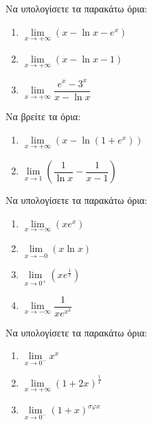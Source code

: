 \documentclass{presentation}
\begin{document}
\begin{askisi}
  Να υπολογίσετε τα παρακάτω όρια:
  \begin{enumerate}
    \item<1-> $\lim\limits_{x \to +\infty}{ (x-\ln x-e^x) }$
    \item<2-> $\lim\limits_{x \to +\infty}{ (x-\ln x-1) }$
    \item<3-> $\lim\limits_{x \to +\infty}{ \dfrac{e^x-3^x}{x-\ln x} }$
  \end{enumerate}

\end{askisi}

\begin{askisi}
  Να βρείτε τα όρια:
  \begin{enumerate}
    \item<1-> $\lim\limits_{x \to +\infty}{ (x-\ln (1+e^x)) }$
    \item<2-> $\lim\limits_{x \to 1}{ \left( \dfrac{1}{\ln x} - \dfrac{1}{x-1} \right)  }$
  \end{enumerate}

\end{askisi}

\begin{askisi}
  Να υπολογίσετε τα παρακάτω όρια:
  \begin{enumerate}
    \item<1-> $\lim\limits_{x \to -\infty}{ (xe^x) }$
    \item<2-> $\lim\limits_{x \to -0}{ (x\ln x) }$
    \item<3-> $\lim\limits_{x \to 0^+}{ \left( xe^{\frac{1}{x}} \right)  }$
    \item<4-> $\lim\limits_{x \to -\infty}{ \dfrac{1}{xe^{x^3}} }$
  \end{enumerate}

\end{askisi}

\begin{askisi}
  Να υπολογίσετε τα παρακάτω όρια:
  \begin{enumerate}[<+->]
    \item $\lim\limits_{x \to 0^-}{ x^x }$
    \item $\lim\limits_{x \to +\infty}{ \left( 1+2x \right)^{\frac{1}{x}}  }$
    \item $\lim\limits_{x \to 0^-}{ \left( 1+x \right)^{σφx}  }$
  \end{enumerate}
\end{askisi}
\end{document}
